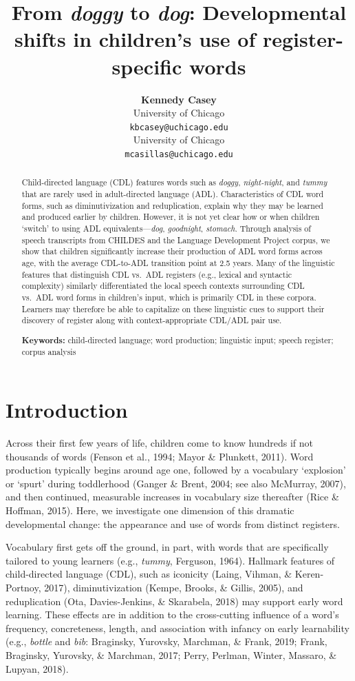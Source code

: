 \documentclass[10pt, letterpaper]{article}
\title{From \emph{doggy} to \emph{dog}: Developmental shifts in
children's use of register-specific words}
\author{{\large \bf Kennedy Casey} \\ University of Chicago \\ \texttt{kbcasey@uchicago.edu} \And {\large \bf Marisa Casillas} \\ University of Chicago \\ \texttt{mcasillas@uchicago.edu}}
\begin{document}
\maketitle

\begin{abstract}
Child-directed language (CDL) features words such as \emph{doggy},
\emph{night-night}, and \emph{tummy} that are rarely used in
adult-directed language (ADL). Characteristics of CDL word forms, such
as diminutivization and reduplication, explain why they may be learned
and produced earlier by children. However, it is not yet clear how or
when children `switch' to using ADL equivalents---\emph{dog},
\emph{goodnight}, \emph{stomach}. Through analysis of speech transcripts
from CHILDES and the Language Development Project corpus, we show that
children significantly increase their production of ADL word forms
across age, with the average CDL-to-ADL transition point at 2.5 years.
Many of the linguistic features that distinguish CDL vs.~ADL registers
(e.g., lexical and syntactic complexity) similarly differentiated the
local speech contexts surrounding CDL vs.~ADL word forms in children's
input, which is primarily CDL in these corpora. Learners may therefore
be able to capitalize on these linguistic cues to support their
discovery of register along with context-appropriate CDL/ADL pair use.

\textbf{Keywords:}
child-directed language; word production; linguistic input; speech
register; corpus analysis
\end{abstract}

\hypertarget{introduction}{%
\section{Introduction}\label{introduction}}

Across their first few years of life, children come to know hundreds if
not thousands of words (Fenson et al., 1994; Mayor \& Plunkett, 2011).
Word production typically begins around age one, followed by a
vocabulary `explosion' or `spurt' during toddlerhood (Ganger \& Brent,
2004; see also McMurray, 2007), and then continued, measurable increases
in vocabulary size thereafter (Rice \& Hoffman, 2015). Here, we
investigate one dimension of this dramatic developmental change: the
appearance and use of words from distinct registers.

Vocabulary first gets off the ground, in part, with words that are
specifically tailored to young learners (e.g., \emph{tummy}, Ferguson,
1964). Hallmark features of child-directed language (CDL), such as
iconicity (Laing, Vihman, \& Keren-Portnoy, 2017), diminutivization
(Kempe, Brooks, \& Gillis, 2005), and reduplication (Ota,
Davies-Jenkins, \& Skarabela, 2018) may support early word learning.
These effects are in addition to the cross-cutting influence of a word's
frequency, concreteness, length, and association with infancy on early
learnability (e.g., \emph{bottle} and \emph{bib}: Braginsky, Yurovsky,
Marchman, \& Frank, 2019; Frank, Braginsky, Yurovsky, \& Marchman, 2017;
Perry, Perlman, Winter, Massaro, \& Lupyan, 2018).
\end{document}
